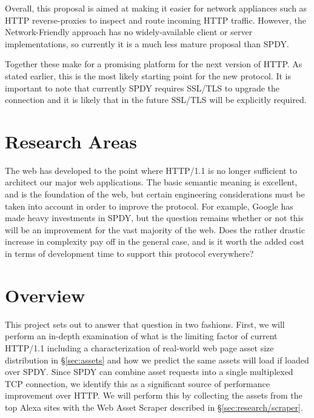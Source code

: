 \documentclass[11pt,letterpaper,notitlepage]{article}
\begin{document}
Overall, this proposal is aimed at making it easier for network appliances such
as HTTP reverse-proxies to inspect and route incoming HTTP traffic. However,
the Network-Friendly approach has no widely-available client or server
implementations, so currently it is a much less mature proposal than SPDY.

Together these make for a promising platform for the next version of HTTP.  As
stated earlier, this is the most likely starting point for the new protocol. It
is important to note that currently SPDY requires SSL/TLS to upgrade the
connection and it is likely that in the future SSL/TLS will be explicitly
required.

\section{Research Areas}
\label{sec:research}
The web has developed to the point where HTTP/1.1 is no longer sufficient to
architect our major web applications. The basic semantic meaning is excellent,
and is the foundation of the web, but certain engineering considerations must
be taken into account in order to improve the protocol. For example, Google has
made heavy investments in SPDY, but the question remains whether or not this
will be an improvement for the vast majority of the web.  Does the rather
drastic increase in complexity pay off in the general case, and is it worth the
added cost in terms of development time to support this protocol everywhere?

\section{Overview}
\label{sec:research/overview}
This project sets out to answer that question in two fashions. First, we will
perform an in-depth examination of what is the limiting factor of current
HTTP/1.1 including a characterization of real-world web page asset size
distribution in \S\ref{sec:assets} and how we predict the same assets will load
if loaded over SPDY. Since SPDY can combine asset requests into a single
multiplexed TCP connection, we identify this as a significant source of
performance improvement over HTTP. We will perform this by collecting the
assets from the top Alexa sites with the Web Asset Scraper described in
\S\ref{sec:research/scraper}.
\end{document}
